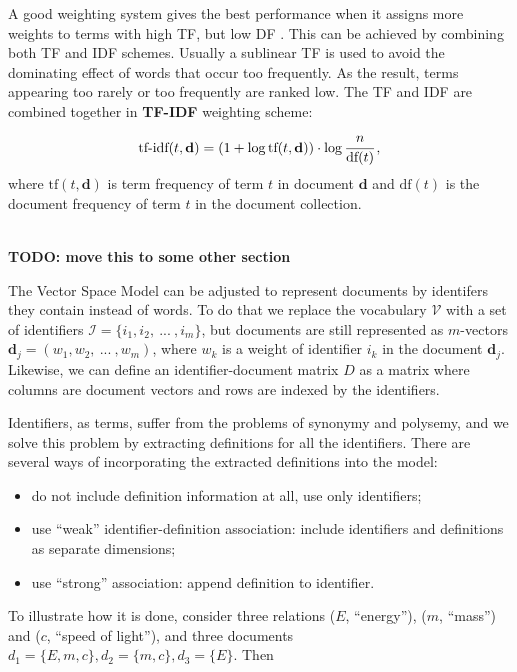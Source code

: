 A good weighting system gives the best performance when it assigns
more weights to terms with high TF, but low DF \cite{salton1988term}.
This can be achieved by combining both TF and IDF
schemes. Usually a sublinear TF is used to avoid the dominating effect of
words that occur too frequently. As the result, terms appearing
too rarely or too frequently are ranked low.
The TF and IDF are combined together in \textbf{TF-IDF} weighting scheme:
$$\text{tf-idf}(t, \mathbf d) = (1 + \log \text{tf}(t, \mathbf d)) \cdot \log \cfrac{n}{\text{df}(t)} \, ,$$
where $\text{tf}(t, \mathbf d)$ is term frequency of term $t$ in document
$\mathbf d$ and $\text{df}(t)$ is the document frequency of term $t$ in
the document collection.

\ \\

\textbf{TODO: move this to some other section}

The Vector Space Model can be adjusted to represent documents by identifers
they contain instead of words. To do that we replace the vocabulary $\mathcal V$
with  a set of identifiers $\mathcal I = \{ i_1, i_2, \ ... \ , i_m \}$,
but documents are still represented as $m$-vectors $\mathbf d_j = (w_1, w_2, \ ... \ , w_m)$,
where $w_k$ is a weight of identifier $i_k$ in the document $\mathbf d_j$.
Likewise, we can define an identifier-document matrix $D$ as a matrix where
columns are document vectors and rows are indexed by the identifiers.

Identifiers, as terms, suffer from the problems of synonymy and polysemy,
and we solve this problem by extracting definitions for all the identifiers.
There are several ways of incorporating the extracted definitions into the
model:

\begin{itemize}
\itemsep1pt\parskip0pt
  \item do not include definition information at all, use only identifiers;
  \item use ``weak'' identifier-definition association: include identifiers and
        definitions as separate dimensions;
  \item use ``strong'' association: append definition to identifier.
\end{itemize}

To illustrate how it is done, consider three relations ($E$, ``energy''),
($m$, ``mass'') and ($c$, ``speed of light''), and three documents
$d_1 = \{E, m, c\}, d_2 = \{ m, c\}, d_3 = \{ E \}$. Then

